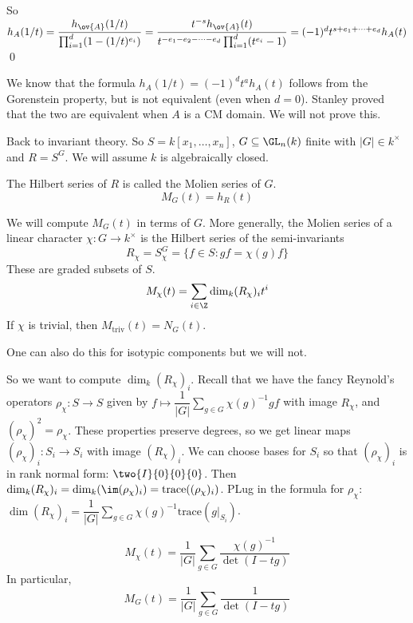 So $h_A(1/t)= \dfrac{h_{\ov{A}}(1/t)}{\prod_{i=1}^d (1- (1/t)^{e_i})}= \dfrac{t^{-s} h_{\ov{A}}(t)}{t^{-e_1-e_2-\cdots-e_d} \prod_{i=1}^d (t^{e_i}-1)}= (-1)^d t^{s+e_1+\cdots+e_d} h_A(t)$ \qed \\


\begin{rem}
We know that the formula $h_A(1/t) = (-1)^d t^a h_A(t)$ follows from the Gorenstein property, but is not equivalent (even when $d=0$). Stanley proved that the two are equivalent when $A$ is a CM domain. We will not prove this. 
\end{rem}


Back to invariant theory. So $S= k[x_1,\ldots,x_n]$, $G \subseteq \GL_n(k)$ finite with $|G| \in k^\times$ and $R= S^G$. We will assume $k$ is algebraically closed.

\begin{dfn}
The Hilbert series of $R$ is called the Molien series of $G$.
	\[
	M_G(t) = h_R(t)
	\]
\end{dfn}

We will compute $M_G(t)$ in terms of $G$. More generally, the Molien series of a linear character $\chi: G \to k^\times$ is the Hilbert series of the semi-invariants
	\[
	R_\chi = S_\chi^G= \{ f \in S \colon gf= \chi(g)f \}
	\]
These are graded subsets of $S$. 
	\[
	M_\chi(t) = \sum_{i \in \Z} \dim_k(R_\chi)_i t^i
	\]
If $\chi$ is trivial, then $M_{\text{triv}}(t) = N_G(t)$. 

\begin{rem}
One can also do this for isotypic components but we will not. 
\end{rem}


So we want to compute $\dim_k(R_\chi)_i$. Recall that we have the fancy Reynold's operators $\rho_\chi: S \to S$ given by $f \mapsto \dfrac{1}{|G|} \sum_{g \in G} \chi(g)^{-1} gf$ with image $R_\chi$, and $(\rho_\chi)^2= \rho_\chi$. These properties preserve degrees, so we get linear maps $(\rho_\chi)_i: S_i \to S_i$ with image $(R_\chi)_i$. We can choose bases for $S_i$ so that $(\rho_\chi)_i$ is in rank normal form: $\two{I}{0}{0}{0}$. Then $\dim_k(R_\chi)_i = \dim_k(\im(\rho_\chi)_i)= \text{trace}((\rho_\chi)_i)$. PLug in the formula for $\rho_\chi$: $\dim(R_\chi)_i= \dfrac{1}{|G|} \sum_{g \in G} \chi(g)^{-1} \text{trace}(g|_{S_i})$.


\begin{thm}[Molien]
	\[
	M_\chi(t) = \dfrac{1}{|G|} \sum_{g \in G} \dfrac{\chi(g)^{-1}}{\det(I-tg)}
	\]
In particular,
	\[
	M_G(t) = \dfrac{1}{|G|} \sum_{g \in G} \dfrac{1}{\det(I-tg)}
	\]
\end{thm}


